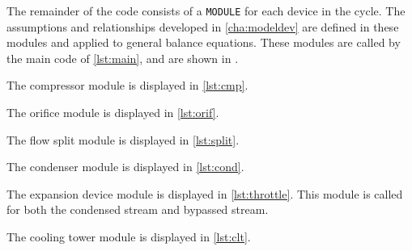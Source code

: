 The remainder of the code consists of a \verb+MODULE+ for each device in the cycle.
The assumptions and relationships developed in \cref{cha:modeldev} are 
defined in these modules and applied to general balance equations.
These modules are called by the main code of \cref{lst:main}, and are shown in .

The compressor module is displayed in \cref{lst:cmp}.


The orifice module is displayed in \cref{lst:orif}.


The flow split module is displayed in \cref{lst:split}.


The condenser module is displayed in \cref{lst:cond}.


The expansion device module is displayed in \cref{lst:throttle}.
This module is called for both the condensed stream and bypassed stream.


The cooling tower module is displayed in \cref{lst:clt}.
